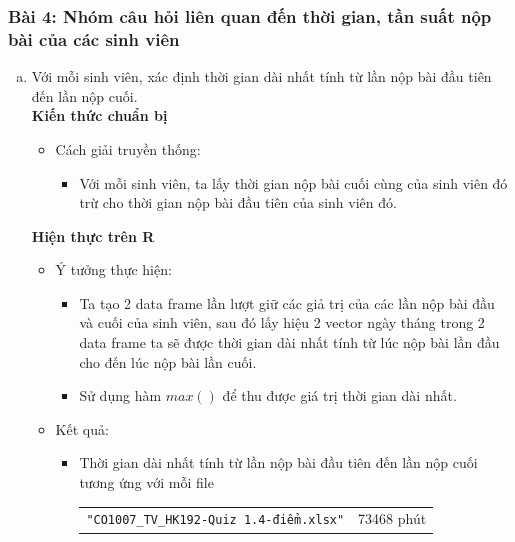 \documentclass[a4paper]{article}
\theoremstyle{definition}
\begin{document}
\subsubsection*{Bài 4: Nhóm câu hỏi liên quan đến thời gian, tần suất nộp bài của các sinh viên}
\begin{enumerate}[a)]
    \bf\item {Với mỗi sinh viên, xác định thời gian dài nhất tính từ lần nộp bài đầu tiên đến lần nộp cuối.}\\[6pt]
    \bf Kiến thức chuẩn bị\normalfont
    \begin{itemize}
        \item Cách giải truyền thống:
        \begin{itemize}
            \item Với mỗi sinh viên, ta lấy thời gian nộp bài cuối cùng của sinh viên đó trừ cho thời gian nộp bài đầu tiên của sinh viên đó.
        \end{itemize}
    \end{itemize}
    \bf Hiện thực trên R\normalfont
    \begin{itemize}
        \item Ý tưởng thực hiện:
        \begin{itemize}
            \item Ta tạo 2 data frame lần lượt giữ các giả trị của các lần nộp bài đầu và cuối của sinh viên, sau đó lấy hiệu 2 vector ngày tháng trong 2 data frame ta sẽ được thời gian dài nhất tính từ lúc nộp bài lần đầu cho đến lúc nộp bài lần cuối.
            \item Sử dụng hàm $max()$ để thu được giá trị thời gian dài nhất.
        \end{itemize}
        \item Kết quả:
        \begin{itemize}
            \item Thời gian dài nhất tính từ lần nộp bài đầu tiên đến lần nộp cuối tương ứng với mỗi file
            \begin{center}
                \begin{tabular}{l l}
                     \texttt{"CO1007\_TV\_HK192-Quiz 1.4-điểm.xlsx"} & 73468 phút\\ 

\end{tabular}
\end{center}
\end{itemize}
\end{itemize}
\end{enumerate}
\end{document}
